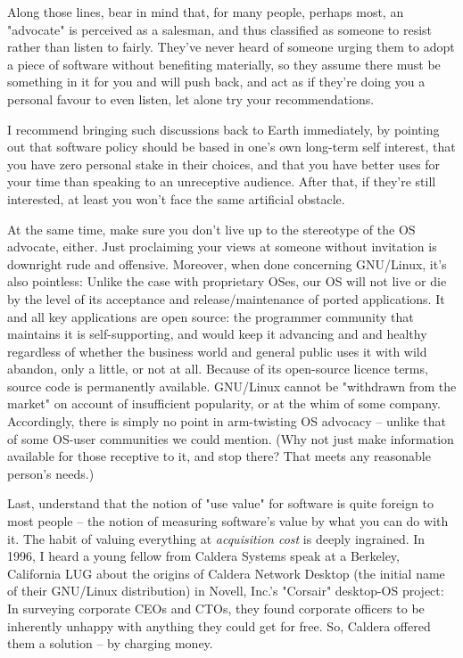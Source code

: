 \documentclass{HOWTO}
\begin{document}
Along those lines, bear in mind that, for many people, perhaps most, an
"advocate" is perceived as a salesman, and thus classified as someone to
resist rather than listen to fairly.  They've never heard of someone
urging them to adopt a piece of software without
benefiting materially, so they assume there must be something in
it for you and will push back, and
act as if they're doing you a personal favour to even listen, let alone
try your recommendations.  

I recommend bringing such discussions back to Earth
immediately, by pointing out that software policy should be based in
one's own long-term self interest, that you have zero personal stake in
their choices, and that you have better uses for your time than speaking
to an unreceptive audience. After that, if
they're still interested, at least you won't face the same artificial
obstacle.

At the same time, make sure you don't live up to the stereotype of the
OS advocate, either.  Just proclaiming your views at someone without
invitation is downright rude and offensive.  Moreover, when done
concerning GNU/Linux, it's also pointless:  Unlike the case with proprietary
OSes, our OS will not live or die by the level of its acceptance and
release/maintenance of ported applications.  It and all key applications
are open source: the programmer community that maintains it is
self-supporting, and would keep it advancing and and healthy regardless
of whether the business world and general public uses it with wild
abandon, only a little, or not at all. Because of its open-source
licence terms, source code is permanently available. GNU/Linux cannot be
"withdrawn from the market" on account of insufficient popularity, or at
the whim of some company.  Accordingly, there is simply no point in
arm-twisting OS advocacy -- unlike that of some OS-user communities we
could mention.   (Why not just make information available for those
receptive to it, and stop there?  That meets any reasonable person's
needs.)

Last, understand that the notion of "use value" for software is quite
foreign to most people -- the notion of measuring software's value by
what you can do with it.  The habit of valuing everything at
{\itshape acquisition cost\/} is deeply ingrained.  In 1996, I heard a young
fellow from Caldera Systems speak at a Berkeley, California LUG about
the origins of Caldera Network Desktop (the initial name of their GNU/Linux
distribution) in Novell, Inc.'s "Corsair" desktop-OS project:  In
surveying corporate CEOs and CTOs, they found corporate officers to be
inherently unhappy with anything they could get for free.  So, Caldera
offered them a solution -- by charging money.
\end{document}
